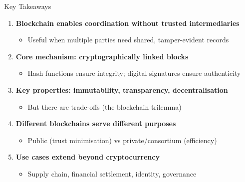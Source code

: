 \documentclass[10pt]{beamer}
\begin{document}
\begin{frame}{Key Takeaways}
  \begin{enumerate}
    \item \textbf{Blockchain enables coordination without trusted intermediaries}
    \begin{itemize}
      \item Useful when multiple parties need shared, tamper-evident records
    \end{itemize}
    
    \vspace{0.3em}
    \item \textbf{Core mechanism: cryptographically linked blocks}
    \begin{itemize}
      \item Hash functions ensure integrity; digital signatures ensure authenticity
    \end{itemize}
    
    \vspace{0.3em}
    \item \textbf{Key properties: immutability, transparency, decentralisation}
    \begin{itemize}
      \item But there are trade-offs (the blockchain trilemma)
    \end{itemize}
    
    \vspace{0.3em}
    \item \textbf{Different blockchains serve different purposes}
    \begin{itemize}
      \item Public (trust minimisation) vs private/consortium (efficiency)
    \end{itemize}
    
    \vspace{0.3em}
    \item \textbf{Use cases extend beyond cryptocurrency}
    \begin{itemize}
      \item Supply chain, financial settlement, identity, governance
    \end{itemize}
  \end{enumerate}
\end{frame}
\end{document}
